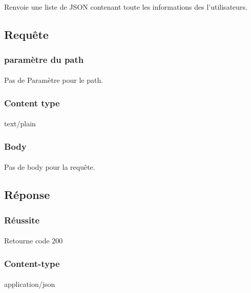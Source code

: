 \paragraph{}
	Renvoie une liste de JSON contenant toute les informations des l'utilisateurs.

\subsection{Requête}
	\subsubsection{paramètre du path}
		\paragraph{}
			Pas de Paramètre pour le path.
	
	\subsubsection{Content type}
		\paragraph{}
			text/plain
			
	\subsubsection{Body}
		\paragraph{}
			Pas de body pour la requête.

\subsection{Réponse}
	\subsubsection{Réussite}
		\paragraph{}
			Retourne code 200
			
	\subsubsection{Content-type}
		\paragraph{}
			application/json
	
